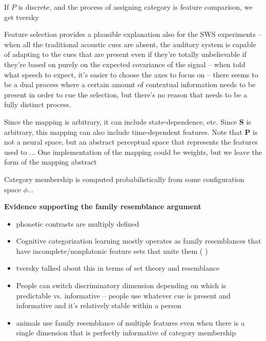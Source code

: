 \begin{multicols}{2}
If $P$ is discrete, and the process of assigning category is feature comparison, we get tversky


Feature selection provides a plausible explanation also for the SWS experiments -- when all the traditional acoustic cues are absent, the auditory system is capable of adapting to the cues that are present even if they're totally unbelievable if they're based on purely on the expected covariance of the signal\cite{remezSpeechPerceptionTraditional1981} -- when told what speech to expect, it's easier to choose the axes to focus on -- there seems to be a dual process where a certain amount of contextual information needs to be present in order to cue the selection, but there's no reason that needs to be a fully distinct process.


Since the mapping is arbitrary, it can include state-dependence, etc. Since $\mathbf{S}$ is arbitrary, this mapping can also include time-dependent features. Note that $\mathbf{P}$ is not a neural space, but an abstract perceptual space that represents the features used to ... One implementation of the mapping could be weights, but we leave the form of the mapping abstract

Category membership is computed probabilistically from some configuration space $\phi$...








\textbf{Evidence supporting the family resemblance argument}
\begin{itemize}
	\item phonetic contrasts are multiply defined\cite{Lisker1977,Bailey1980}
	\item Cognitive categorization learning mostly operates as family resemblances that have incomplete/nonplatonic feature sets that unite them (\cite{roschFamilyResemblancesStudies1975}\cite{roschWittgensteinCategorizationResearch1987} \cite{couchmanRulesResemblanceTheir2010})
	\item tversky talked about this in terms of set theory and resemblance \cite{tverskyStudiesSimilarity1978} \cite{Tversky1970}
	\item People can switch discriminatory dimension depending on which is predictable vs. informative -- people use whatever cue is present and informative \cite{kiefteAbsorptionReliableSpectral2008} and it's relatively stable within a person \cite{souzaReliabilityRepeatabilitySpeech2018}
	\item animals use family resemblance of multiple features even when there is a single dimension that is perfectly informative of category membership \cite{leaUseMultipleDimensions2008, couchmanRulesResemblanceTheir2010}


\end{itemize}
\end{multicols}
